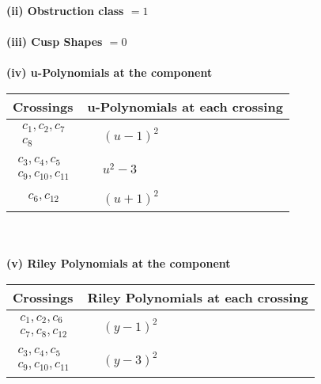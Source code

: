\documentclass[1p]{elsarticle_modified}
\theoremstyle{definition}
\begin{document}
\flushleft \textbf{(ii) Obstruction class $= 1$}\\~\\
\flushleft \textbf{(iii) Cusp Shapes $= 0$}\\~\\
\newpage\renewcommand{\arraystretch}{1}
\flushleft \textbf{(iv) u-Polynomials at the component}\newline \\
\begin{tabular}{m{50pt}|m{274pt}}
Crossings & \hspace{64pt}u-Polynomials at each crossing \\
\hline $$\begin{aligned}c_{1},c_{2},c_{7}\\c_{8}\end{aligned}$$&$\begin{aligned}
&(u-1)^2
\end{aligned}$\\
\hline $$\begin{aligned}c_{3},c_{4},c_{5}\\c_{9},c_{10},c_{11}\end{aligned}$$&$\begin{aligned}
&u^2-3
\end{aligned}$\\
\hline $$\begin{aligned}c_{6},c_{12}\end{aligned}$$&$\begin{aligned}
&(u+1)^2
\end{aligned}$\\
\hline
\end{tabular}\\~\\
\newpage\renewcommand{\arraystretch}{1}
\flushleft \textbf{(v) Riley Polynomials at the component}\newline \\
\begin{tabular}{m{50pt}|m{274pt}}
Crossings & \hspace{64pt}Riley Polynomials at each crossing \\
\hline $$\begin{aligned}c_{1},c_{2},c_{6}\\c_{7},c_{8},c_{12}\end{aligned}$$&$\begin{aligned}
&(y-1)^2
\end{aligned}$\\
\hline $$\begin{aligned}c_{3},c_{4},c_{5}\\c_{9},c_{10},c_{11}\end{aligned}$$&$\begin{aligned}
&(y-3)^2
\end{aligned}$\\
\hline
\end{tabular}\\~\\
\end{document}
